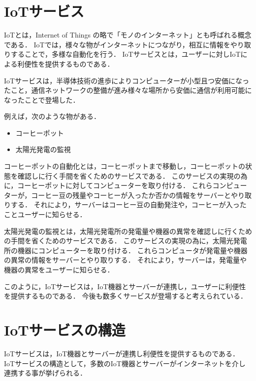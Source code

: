 \section{IoTサービス}
IoTとは，Internet of Things の略で「モノのインターネット」とも呼ばれる概念である．
IoTでは，様々な物がインターネットにつながり，相互に情報をやり取りすることで，多様な自動化を行う．
IoTサービスとは，ユーザーに対しIoTによる利便性を提供するものである．
\medskip

IoTサービスは，半導体技術の進歩によりコンピューターが小型且つ安価になったこと，通信ネットワークの整備が進み様々な場所から安価に通信が利用可能になったことで登場した．
\medskip

例えば，次のような物がある．
\begin{itemize}
	\item コーヒーポット
	\item 太陽光発電の監視
\end{itemize}

コーヒーポットの自動化とは，コーヒーポットまで移動し，コーヒーポットの状態を確認しに行く手間を省くためのサービスである．
このサービスの実現の為に，コーヒーポットに対してコンピューターを取り付ける．
これらコンピューターが，コーヒー豆の残量やコーヒーが入ったか否かの情報をサーバーとやり取りする．
それにより，サーバーはコーヒー豆の自動発注や，コーヒーが入ったことユーザーに知らせる．
\medskip

太陽光発電の監視とは，太陽光発電所の発電量や機器の異常を確認しに行くための手間を省くためのサービスである．
このサービスの実現の為に，太陽光発電所の機器にコンピューターを取り付ける．
これらコンピュータが発電量や機器の異常の情報をサーバーとやり取りする．
それにより，サーバーは，発電量や機器の異常をユーザーに知らせる．
\medskip

このように，IoTサービスは，IoT機器とサーバーが連携し，ユーザーに利便性を提供するものである．
今後も数多くサービスが登場すると考えられている．

\section{IoTサービスの構造}
IoTサービスは，IoT機器とサーバーが連携し利便性を提供するものである．
IoTサービスの構造として，多数のIoT機器とサーバーがインターネットを介し連携する事が挙げられる．
\medskip

